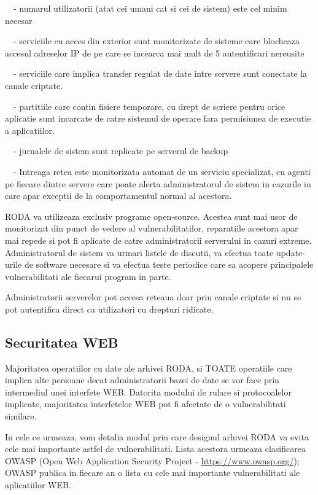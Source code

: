 {\sffamily\color{black}
\ \ {}- numarul utilizatorii (atat cei umani cat si cei de sistem) este cel minim necesar}

{\sffamily\color{black}
\ \ {}- serviciile cu acces din exterior sunt monitorizate de sisteme care blocheaza accesul adreselor IP de pe care se
incearca mai mult de 5 autentificari nereusite}

{\sffamily\color{black}
\ \ {}- serviciile care implica transfer regulat de date intre servere sunt conectate la canale criptate.}

{\sffamily\color{black}
\ \ {}- partitiile care contin fisiere temporare, cu drept de scriere pentru orice aplicatie sunt incarcate de catre
sistemul de operare fara permisiunea de executie a aplicatiilor. }

{\sffamily\color{black}
\ \ {}- jurnalele de sistem sunt replicate pe serverul de backup}

{\sffamily\color{black}
\ \ {}- Intreaga retea este monitorizata automat de un serviciu specializat, cu agenti pe fiecare dintre servere care
poate alerta administratorul de sistem in cazurile in care apar exceptii de la comportamentul normal al acestora. }

RODA va utilizeaza exclusiv programe open-source. Acestea sunt mai usor de monitorizat din punct de vedere al
vulnerabilitatilor, reparatiile acestora apar mai repede si pot fi aplicate de catre administratorii serverului in
cazuri extreme. Administratorul de sistem va urmari listele de discutii, va efectua toate update-urile de software
necesare si va efectua teste periodice care sa acopere principalele vulnerabilitati ale fiecarui program in parte.

Administratorii serverelor pot accesa reteaua doar prin canale criptate si nu se pot autentifica direct ca utilizatori
cu drepturi ridicate.

\subsection{Securitatea WEB}

Majoritatea operatiilor cu date ale arhivei RODA, si TOATE operatiile care implica alte persoane decat administratorii
bazei de date se vor face prin intermediul unei interfete WEB. Datorita modului de rulare si protocoalelor implicate,
majoritatea interfetelor WEB pot fi afectate de o vulnerabilitati similare. 

In cele ce urmeaza, vom detalia modul prin
care designul arhivei RODA va evita cele mai importante astfel de vulnerabilitati. 
Lista acestora urmeaza clasificarea
OWASP (Open Web Application Security Project -
\href{https://www.owasp.org/}{https://www.owasp.org/});
OWASP publica in fiecare an o lista cu cele mai importante vulnerabilitati ale aplicatiilor WEB.

